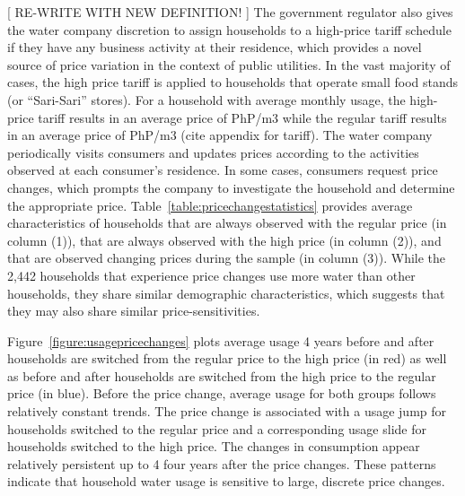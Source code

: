 \documentclass[12pt,table]{article}
\begin{document}
[ RE-WRITE WITH NEW DEFINITION! ]
The government regulator also gives the water company discretion to assign households to a high-price tariff schedule if they have any business activity at their residence, which provides a novel source of price variation in the context of public utilities.  In the vast majority of cases, the high price tariff is applied to households that operate small food stands (or ``Sari-Sari'' stores).  For a household with average monthly usage, the high-price tariff results in an average price of PhP/m3 while the regular tariff results in an average price of PhP/m3 (cite appendix for tariff).  The water company periodically visits consumers and updates prices according to the activities observed at each consumer's residence.  In some cases, consumers request price changes, which prompts the company to investigate the household and determine the appropriate price.  Table~\ref{table:pricechangestatistics} provides average characteristics of households that are always observed with the regular price (in column (1)), that are always observed with the high price (in column (2)), and that are observed changing prices during the sample (in column (3)).  While the 2,442 households that experience price changes use more water than other households, they share similar demographic characteristics, which suggests that they may also share similar price-sensitivities.  

Figure~\ref{figure:usagepricechanges} plots average usage 4 years before and after households are switched from the regular price to the high price (in red) as well as before and after households are switched from the high price to the regular price (in blue).  Before the price change, average usage for both groups follows relatively constant trends.  The price change is associated with a usage jump for households switched to the regular price and a corresponding usage slide for households switched to the high price.  The changes in consumption appear relatively persistent up to 4 four years after the price changes.  These patterns indicate that household water usage is sensitive to large, discrete price changes.  
\end{document}
